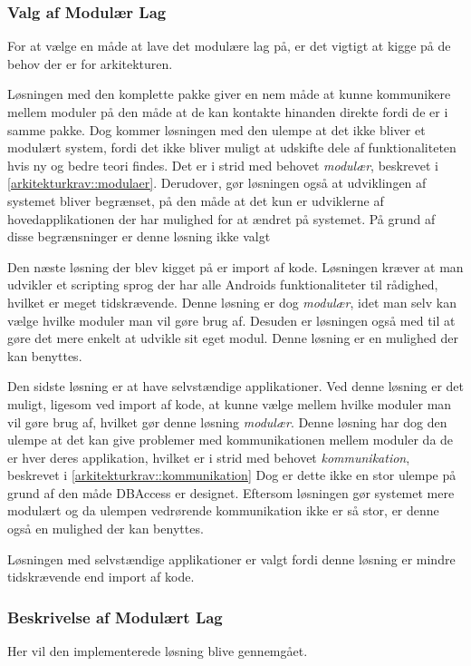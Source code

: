 \subsubsection{Valg af Modulær Lag}
For at vælge en måde at lave det modulære lag på, er det vigtigt at kigge på de behov der er for arkitekturen.

Løsningen med den komplette pakke giver en nem måde at kunne kommunikere mellem moduler på den måde at de kan kontakte hinanden direkte fordi de er i samme pakke.
Dog kommer løsningen med den ulempe at det ikke bliver et modulært system, fordi det ikke bliver muligt at udskifte dele af funktionaliteten hvis ny og bedre teori findes.
Det er i strid med behovet \textit{modulær}, beskrevet i \cref{arkitekturkrav::modulaer}.
Derudover, gør løsningen også at udviklingen af systemet bliver begrænset, på den måde at det kun er udviklerne af hovedapplikationen der har mulighed for at ændret på systemet.
På grund af disse begrænsninger er denne løsning ikke valgt

Den næste løsning der blev kigget på er import af kode.
Løsningen kræver at man udvikler et scripting sprog der har alle Androids funktionaliteter til rådighed, hvilket er meget tidskrævende.
Denne løsning er dog \textit{modulær}, idet man selv kan vælge hvilke moduler man vil gøre brug af.
Desuden er løsningen også med til at gøre det mere enkelt at udvikle sit eget modul.
Denne løsning er en mulighed der kan benyttes.

Den sidste løsning er at have selvstændige applikationer.
Ved denne løsning er det muligt, ligesom ved import af kode, at kunne vælge mellem hvilke moduler man vil gøre brug af, hvilket gør denne løsning \textit{modulær}.
Denne løsning har dog den ulempe at det kan give problemer med kommunikationen mellem moduler da de er hver deres applikation, hvilket er i strid med behovet \textit{kommunikation}, beskrevet i \cref{arkitekturkrav::kommunikation}
Dog er dette ikke en stor ulempe på grund af den måde DBAccess er designet.
Eftersom løsningen gør systemet mere modulært og da ulempen vedrørende kommunikation ikke er så stor, er denne også en mulighed der kan benyttes.

Løsningen med selvstændige applikationer er valgt fordi denne løsning er mindre tidskrævende end import af kode.



\subsubsection{Beskrivelse af Modulært Lag}\label{modul_definition}
Her vil den implementerede løsning blive gennemgået.

